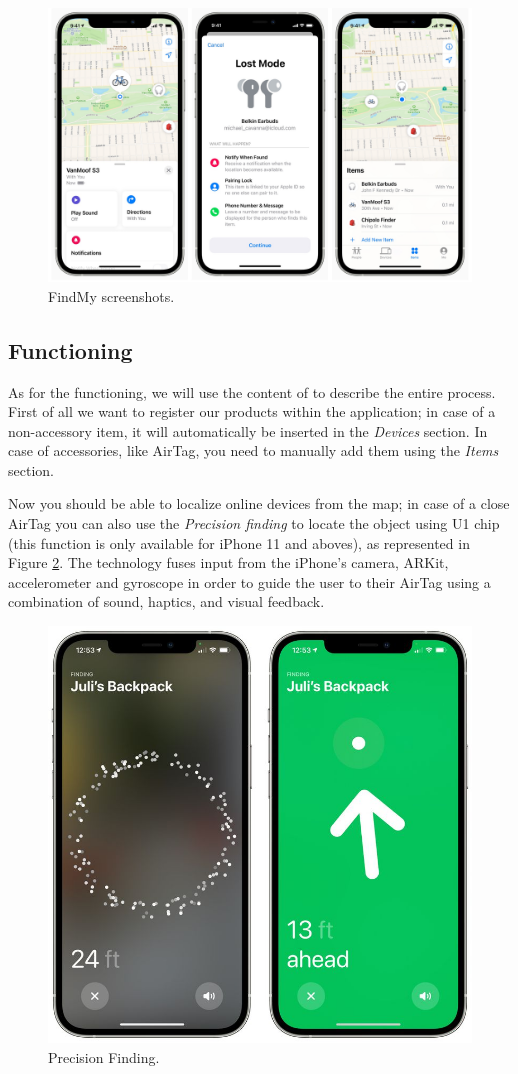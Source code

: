 \documentclass[english]{article}
\begin{document}
\begin{figure}[t]
	\centering
	\includegraphics[width=.9\textwidth]{images/findmy.jpg}
	\caption{FindMy screenshots.}
	\label{findmy2}
\end{figure}

\subsection{Functioning}
As for the functioning, we will use the content of \cite{Mayo_2021,Itani_2021,Clover_2022,OBoyle_2021} to describe the entire process. First of all we want to register our products within the application; in case of a non-accessory item, it will automatically be inserted in the \textit{Devices} section. In case of accessories, like AirTag, you need to manually add them using the \textit{Items} section.

Now you should be able to localize online devices from the map; in case of a close AirTag you can also use the \textit{Precision finding} to locate the object using U1 chip (this function is only available for iPhone 11 and aboves), as represented in Figure \ref{findmy1}. The technology fuses input from the iPhone's camera, ARKit, accelerometer and gyroscope in order to guide the user to their AirTag using a combination of sound, haptics, and visual feedback. 

\begin{figure}[t]
	\centering
	\includegraphics[width=.6\textwidth]{images/airtag-precision-finding-2.jpg}
	\caption{Precision Finding.}
	\label{findmy1}
\end{figure}
\end{document}

